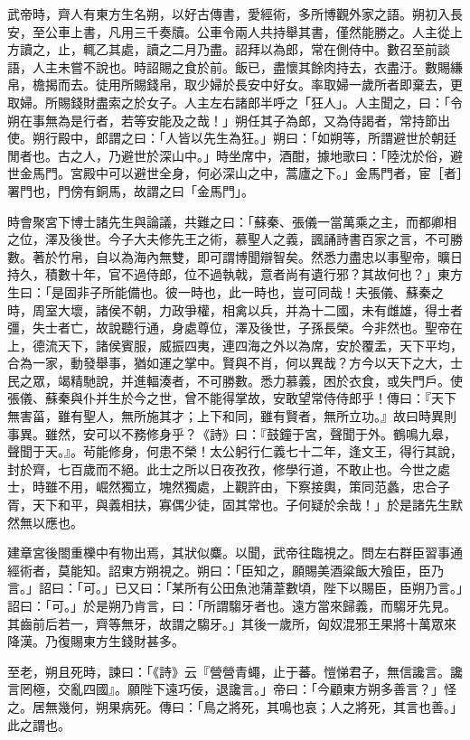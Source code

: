 \begin{pinyinscope}
武帝時，齊人有東方生名朔，以好古傳書，愛經術，多所博觀外家之語。朔初入長安，至公車上書，凡用三千奏牘。公車令兩人共持舉其書，僅然能勝之。人主從上方讀之，止，輒乙其處，讀之二月乃盡。詔拜以為郎，常在側侍中。數召至前談語，人主未嘗不說也。時詔賜之食於前。飯已，盡懷其餘肉持去，衣盡汙。數賜縑帛，檐揭而去。徒用所賜錢帛，取少婦於長安中好女。率取婦一歲所者即棄去，更取婦。所賜錢財盡索之於女子。人主左右諸郎半呼之「狂人」。人主聞之，曰：「令朔在事無為是行者，若等安能及之哉！」朔任其子為郎，又為侍謁者，常持節出使。朔行殿中，郎謂之曰：「人皆以先生為狂。」朔曰：「如朔等，所謂避世於朝廷閒者也。古之人，乃避世於深山中。」時坐席中，酒酣，據地歌曰：「陸沈於俗，避世金馬門。宮殿中可以避世全身，何必深山之中，蒿廬之下。」金馬門者，宦［者］署門也，門傍有銅馬，故謂之曰「金馬門」。

時會聚宮下博士諸先生與論議，共難之曰：「蘇秦、張儀一當萬乘之主，而都卿相之位，澤及後世。今子大夫修先王之術，慕聖人之義，諷誦詩書百家之言，不可勝數。著於竹帛，自以為海內無雙，即可謂博聞辯智矣。然悉力盡忠以事聖帝，曠日持久，積數十年，官不過侍郎，位不過執戟，意者尚有遺行邪？其故何也？」東方生曰：「是固非子所能備也。彼一時也，此一時也，豈可同哉！夫張儀、蘇秦之時，周室大壞，諸侯不朝，力政爭權，相禽以兵，并為十二國，未有雌雄，得士者彊，失士者亡，故說聽行通，身處尊位，澤及後世，子孫長榮。今非然也。聖帝在上，德流天下，諸侯賓服，威振四夷，連四海之外以為席，安於覆盂，天下平均，合為一家，動發舉事，猶如運之掌中。賢與不肖，何以異哉？方今以天下之大，士民之眾，竭精馳說，并進輻湊者，不可勝數。悉力慕義，困於衣食，或失門戶。使張儀、蘇秦與仆并生於今之世，曾不能得掌故，安敢望常侍侍郎乎！傳曰：『天下無害菑，雖有聖人，無所施其才；上下和同，雖有賢者，無所立功。』故曰時異則事異。雖然，安可以不務修身乎？《詩》曰：『鼓鐘于宮，聲聞于外。鶴鳴九皋，聲聞于天。』。茍能修身，何患不榮！太公躬行仁義七十二年，逢文王，得行其說，封於齊，七百歲而不絕。此士之所以日夜孜孜，修學行道，不敢止也。今世之處士，時雖不用，崛然獨立，塊然獨處，上觀許由，下察接輿，策同范蠡，忠合子胥，天下和平，與義相扶，寡偶少徒，固其常也。子何疑於余哉！」於是諸先生默然無以應也。

建章宮後閤重櫟中有物出焉，其狀似麋。以聞，武帝往臨視之。問左右群臣習事通經術者，莫能知。詔東方朔視之。朔曰：「臣知之，願賜美酒粱飯大飱臣，臣乃言。」詔曰：「可。」已又曰：「某所有公田魚池蒲葦數頃，陛下以賜臣，臣朔乃言。」詔曰：「可。」於是朔乃肯言，曰：「所謂騶牙者也。遠方當來歸義，而騶牙先見。其齒前后若一，齊等無牙，故謂之騶牙。」其後一歲所，匈奴混邪王果將十萬眾來降漢。乃復賜東方生錢財甚多。

至老，朔且死時，諫曰：「《詩》云『營營青蠅，止于蕃。愷悌君子，無信讒言。讒言罔極，交亂四國』。願陛下遠巧佞，退讒言。」帝曰：「今顧東方朔多善言？」怪之。居無幾何，朔果病死。傳曰：「鳥之將死，其鳴也哀；人之將死，其言也善。」此之謂也。


\end{pinyinscope}
